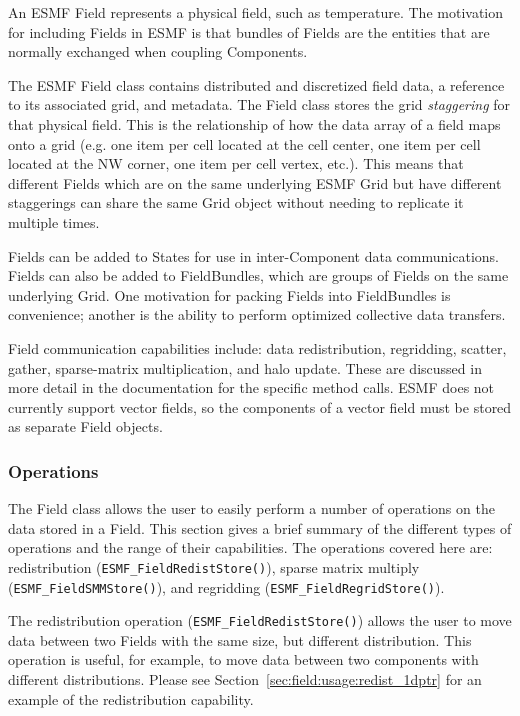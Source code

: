 
An ESMF Field represents a physical field, such as temperature.
The motivation for including Fields in ESMF is that bundles of 
Fields are the entities that are normally exchanged when coupling
Components.  

The ESMF Field class contains distributed and discretized field data, a reference 
to its associated grid, and metadata.  The Field class stores the grid {\it staggering}
for that physical field.
This is the relationship of how the data array of a field maps onto a grid 
(e.g. one item per
cell located at the cell center, one item per cell located at the NW
corner,  one item per cell vertex, etc.).  This means that different Fields
which are on the same underlying ESMF Grid but have different
staggerings can share the same Grid object without needing to replicate
it multiple times. 

Fields can be added to States for use in inter-Component
data communications.  Fields can also be added to FieldBundles,
which are groups of Fields on the same underlying Grid.  
One motivation for packing Fields into FieldBundles is convenience; 
another is the ability to perform optimized collective data transfers.  

Field communication capabilities include: data redistribution, regridding, scatter,
gather, sparse-matrix multiplication, and halo update.  These are discussed
in more detail in the documentation for the specific method calls.  
ESMF does not currently support vector fields, so the components of 
a vector field must be stored as separate Field objects.  

\subsubsection{Operations}

The Field class allows the user to easily perform a number of operations on 
the data stored in a Field. This section gives a brief summary of the different types of operations
and the range of their capabilities. The operations covered here are: redistribution ({\tt ESMF\_FieldRedistStore()}), sparse matrix multiply ({\tt ESMF\_FieldSMMStore()}), and regridding ({\tt ESMF\_FieldRegridStore()}).

The redistribution operation ({\tt ESMF\_FieldRedistStore()}) allows the user to move data between two Fields with the same size, but different 
distribution. This operation is useful, for example, to move data between two components with different distributions. 
Please see Section~\ref{sec:field:usage:redist_1dptr} for an example of the redistribution capability.

